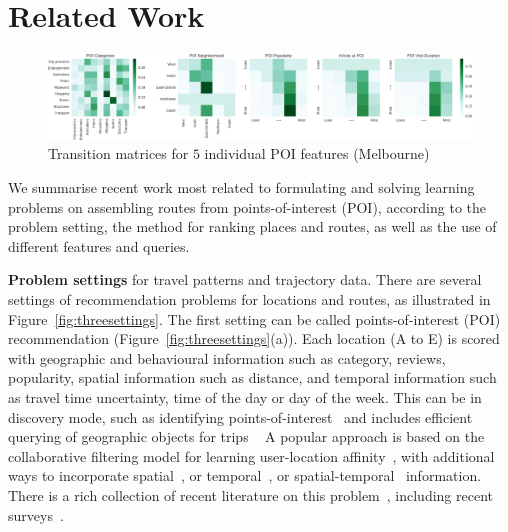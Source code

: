 
\section{Related Work}
\label{sec:relatedwork}


\begin{figure}[htbp]
\includegraphics[width=\textwidth]{fig/poi_transmat.png}
\caption{Transition matrices for $5$ individual POI features (Melbourne)}
\label{fig:transmat}
\end{figure}



We summarise recent work most related to formulating and solving learning problems on assembling routes
from points-of-interest (POI), according to the problem setting, the method for ranking places and routes, as well as the use of different features and queries.

{\bf Problem settings} for travel patterns and trajectory data.
There are several settings of recommendation problems for locations and routes, as illustrated in Figure~\ref{fig:threesettings}.
The first setting can be called points-of-interest (POI) recommendation (Figure~\ref{fig:threesettings}(a)). Each location (A to E) is scored with geographic and behavioural information such as category, reviews, popularity, spatial information such as distance, and temporal information such as travel time uncertainty, time of the day or day of the week.
This can be in discovery mode, such as identifying points-of-interest~\cite{zheng2009mining,li2015instagram} and includes efficient querying of geographic objects for trips ~\cite{hashem2015efficient}
A popular approach is based on the collaborative filtering model
for learning user-location affinity~\cite{shi2011personalized}, with additional ways to incorporate spatial~\cite{lian2014geomf,liu2014exploiting}, or temporal~\cite{yuan2013timeaware,hsieh2014mining,gao2013temporal}, or spatial-temporal~\cite{yuan2014graph} information.
There is a rich collection of recent literature on this problem~\cite{yin2015joint,shi2011personalized,lian2014geomf,liu2014exploiting,yuan2013timeaware,hsieh2014mining,gao2013temporal,yuan2014graph}, including recent surveys~\cite{bao2015recommendations,zheng2014urban}.


